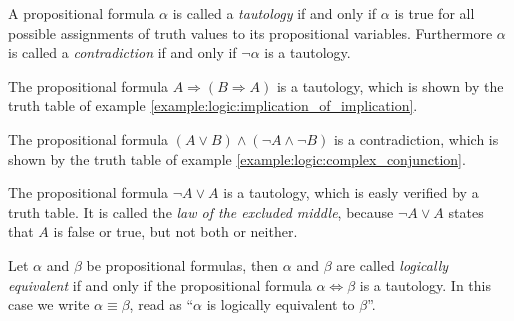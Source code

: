 \begin{definition}[Tautology]
    A propositional formula $\alpha$ is called a \emph{tautology} if and only if $\alpha$ is true for all possible assignments of truth values to its propositional variables. Furthermore $\alpha$ is called a \emph{contradiction} if and only if $\lnot\alpha$ is a tautology.
\end{definition}

\begin{examples}
    \begin{exampleenumerate}
        \item The propositional formula $A\Rightarrow (B\Rightarrow A)$ is a tautology, which is shown by the truth table of example \ref{example:logic:implication_of_implication}.
        \item The propositional formula $(A\lor B)\land (\lnot A\land \lnot B)$ is a contradiction, which is shown by the truth table of example \ref{example:logic:complex_conjunction}.
        \item The propositional formula $\lnot A\lor A$ is a tautology, which is easly verified by a truth table. It is called the \emph{law of the excluded middle}, because $\lnot A\lor A$ states that $A$ is false or true, but not both or neither.
    \end{exampleenumerate}
\end{examples}

\begin{definition}
    Let $\alpha$ and $\beta$ be propositional formulas, then $\alpha$ and $\beta$ are called \emph{logically equivalent} if and only if the propositional formula $\alpha\Leftrightarrow\beta$ is a tautology. In this case we write $\alpha\equiv\beta$, read as \enquote{$\alpha$ is logically equivalent to $\beta$}.
\end{definition}

